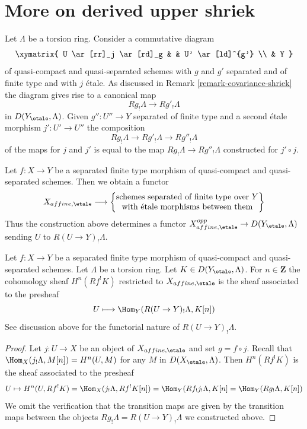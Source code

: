 \section{More on derived upper shriek}
\label{section-more-derived-upper-shriek}

\noindent
Let $\Lambda$ be a torsion ring. Consider a commutative diagram
$$
\xymatrix{
U \ar[rr]_j \ar[rd]_g & & U' \ar[ld]^{g'} \\
& Y
}
$$
of quasi-compact and quasi-separated schemes with $g$ and $g'$
separated and of finite type and with $j$ \'etale. As discussed in
Remark \ref{remark-covariance-shriek} the diagram gives rise to a canonical map
$$
Rg_!\Lambda \longrightarrow Rg'_!\Lambda
$$
in $D(Y_\etale, \Lambda)$. Given $g'' : U'' \to Y$ separated of finite type
and a second \'etale morphism $j' : U' \to U''$ the composition
$$
Rg_!\Lambda \longrightarrow Rg'_!\Lambda \longrightarrow Rg''_!\Lambda
$$
of the maps for $j$ and $j'$ is equal to the map
$Rg_!\Lambda \longrightarrow Rg''_!\Lambda$ constructed for $j' \circ j$.

\medskip\noindent
Let $f : X \to Y$ be a separated finite type morphism of quasi-compact
and quasi-separated schemes. Then we obtain a functor
$$
X_{affine, \etale}
\longrightarrow
\left\{
\begin{matrix}
\text{schemes separated of finite type over }Y\\
\text{with \'etale morphisms between them}
\end{matrix}
\right\}
$$
Thus the construction above determines a functor
$X_{affine, \etale}^{opp} \to D(Y_\etale, \Lambda)$
sending $U$ to $R(U \to Y)_!\Lambda$.

\begin{lemma}
\label{lemma-describe-Rf-upper-shriek}
Let $f : X \to Y$ be a separated finite type morphism of quasi-compact
and quasi-separated schemes. Let $\Lambda$ be a torsion ring.
Let $K \in D(Y_\etale, \Lambda)$. For $n \in \mathbf{Z}$ the
cohomology sheaf $H^n(Rf^!K)$ restricted to $X_{affine, \etale}$
is the sheaf associated to the presheaf
$$
U \longmapsto \Hom_Y(R(U \to Y)_!\Lambda, K[n])
$$
See discussion above for the functorial nature of $R(U \to Y)_!\Lambda$.
\end{lemma}

\begin{proof}
Let $j : U \to X$ be an object of $X_{affine, \etale}$ and set $g = f \circ j$.
Recall that $\Hom_X(j_!\Lambda, M[n]) = H^n(U, M)$ for any $M$ in
$D(X_\etale, \Lambda)$. Then $H^n(Rf^!K)$ is the sheaf associated to the
presheaf
$$
U \mapsto H^n(U, Rf^!K) = \Hom_X(j_!\Lambda, Rf^!K[n]) =
\Hom_Y(Rf_!j_!\Lambda, K[n] = \Hom_Y(Rg_!\Lambda, K[n])
$$
We omit the verification that the transition maps are given by the transition
maps between the objects $Rg_!\Lambda = R(U \to Y)_!\Lambda$ we constructed
above.
\end{proof}





